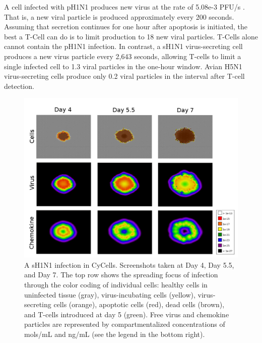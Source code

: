 \documentclass[10pt]{article}
\begin{document}
A cell infected with pH1N1 produces new virus at the rate of 5.08e-3 PFU/s \cite{Mitchell2011}.  That is, a new viral particle is produced approximately every 200 seconds.  Assuming that secretion continues for one hour after apoptosis is initiated, the best a T-Cell can do is to limit production to 18 new viral particles.  T-Cells alone cannot contain the pH1N1 infection.  In contrast, a sH1N1 virus-secreting cell produces a new virus particle every 2,643 seconds, allowing T-cells to limit a single infected cell to 1.3 viral particles in the one-hour window.  Avian H5N1 virus-secreting cells produce only 0.2 viral particles in the interval after T-cell detection. 

\begin{figure}[ht!]
\begin{center}
 \includegraphics[width=\textwidth]{cycells}
 \end{center}
\caption{A sH1N1 infection in CyCells. Screenshots taken at Day 4, Day 5.5, and Day 7.  The top row shows the spreading focus of infection  through the color coding of individual cells:  healthy cells in uninfected tissue (gray),  virus-incubating cells (yellow), virus-secreting cells (orange), apoptotic cells (red), dead cells (brown), and T-cells introduced at day 5 (green).  Free virus and chemokine particles are represented by compartmentalized concentrations of mols/mL and ng/mL (see the legend in the bottom right).} 
 \label{fig:cycells}
\end{figure}
\end{document}
